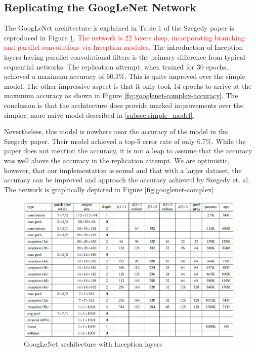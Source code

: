 \documentclass{article}
\begin{document}
\subsection{Replicating the GoogLeNet Network}
The GoogLeNet architecture is explained in Table 1 of the Szegedy paper is reproduced in Figure \ref{fig:googlenet-arch}. \textcolor{red}{The network is 22 layers deep, incorporating branching and parallel convolutions via Inception modules.} The introduction of Inception layers having parallel convolutional filters is the primary difference from typical sequential networks. The replication attempt, when trained for 30 epochs, achieved a maximum accuracy of 60.3\%. This is quite improved over the simple model. The other impressive aspect is that it only took 14 epochs to arrive at the maximum accuracy as shown in Figure \ref{fig:googlenet-complex-accuracy}. The conclusion is that the architecture does provide marked improvements over the simpler, more naive model described in \ref{subsec:simple_model}.

Nevertheless, this model is nowhere near the accuracy of the model in the Szegedy paper. Their model achieved a top-5 error rate of only 6.7\%. While the paper does not mention the accuracy, it is not a leap to assume that the accuracy was well above the accuracy in the replication attempt. We are optimistic, however, that our implementation is sound and that with a larger dataset, the accuracy can be improved and approach the accuracy achieved by Szegedy et. al. The network is graphically depicted in Figure \ref{fig:googlenet-complex}

\begin{figure}[ht]
    \centering
    \includegraphics[scale=0.7]{project/paper_images/googlenet_arch.png}
    \caption{GoogLeNet architecture with Inception layers}
    \label{fig:googlenet-arch}
\end{figure}
\end{document}
